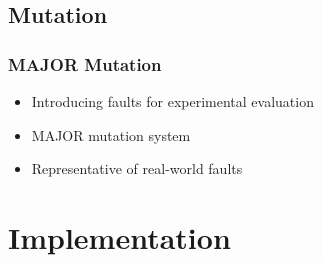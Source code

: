 \documentclass{beamer}
\begin{document}
	\subsection{Mutation}
	\begin{frame}
	\frametitle{MAJOR Mutation}
	\begin{itemize}
		\item Introducing faults for experimental evaluation
		\pause
		\item MAJOR mutation system
		\pause
		\item Representative of real-world faults
	\end{itemize}
	\end{frame}
	\section{Implementation}
\end{document}
